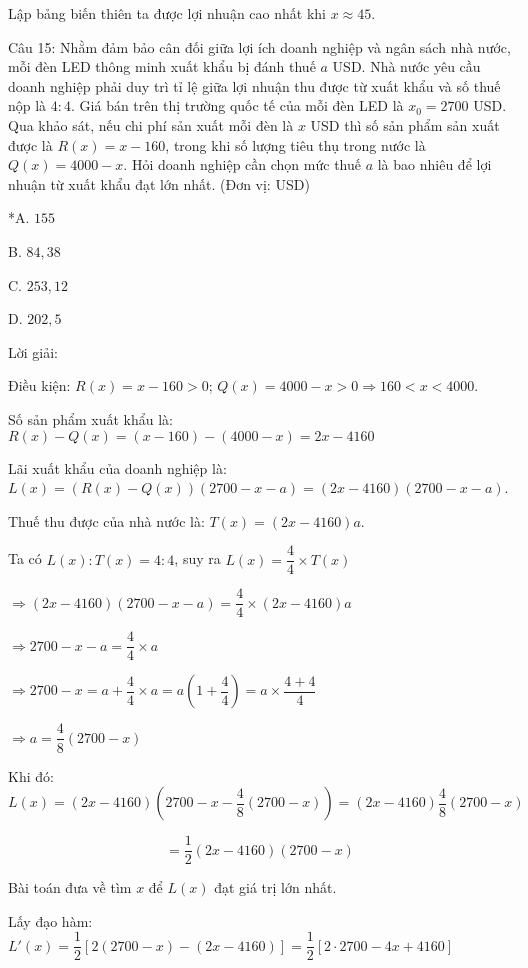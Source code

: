 \documentclass[a4paper,12pt]{article}
\begin{document}
Lập bảng biến thiên ta được lợi nhuận cao nhất khi \(x \approx 45\).




Câu 15: Nhằm đảm bảo cân đối giữa lợi ích doanh nghiệp và ngân sách nhà nước, mỗi đèn LED thông minh xuất khẩu bị đánh thuế \(a\) USD. Nhà nước yêu cầu doanh nghiệp phải duy trì tỉ lệ giữa lợi nhuận thu được từ xuất khẩu và số thuế nộp là \(4 : 4\). Giá bán trên thị trường quốc tế của mỗi đèn LED là \(x_0 = 2700\) USD. Qua khảo sát, nếu chi phí sản xuất mỗi đèn là \(x\) USD thì số sản phẩm sản xuất được là \(R(x) = x - 160\), trong khi số lượng tiêu thụ trong nước là \(Q(x) = 4000 - x\). Hỏi doanh nghiệp cần chọn mức thuế \(a\) là bao nhiêu để lợi nhuận từ xuất khẩu đạt lớn nhất. (Đơn vị: USD)

*A. \(155\)

B. \(84,38\)

C. \(253,12\)

D. \(202,5\)

Lời giải:


Điều kiện: \(R(x) = x - 160 > 0\); \(Q(x) = 4000 - x > 0 \Rightarrow 160 < x < 4000\).

Số sản phẩm xuất khẩu là: \(R(x) - Q(x) = (x - 160) - (4000 - x) = 2x - 4160\)

Lãi xuất khẩu của doanh nghiệp là: \(L(x) = (R(x) - Q(x))(2700 - x - a) = (2x - 4160)(2700 - x - a)\).

Thuế thu được của nhà nước là: \(T(x) = (2x - 4160)a\).

Ta có \(L(x) : T(x) = 4 : 4\), suy ra \(L(x) = \dfrac{4}{4} \times T(x)\)

\(\Rightarrow (2x - 4160)(2700 - x - a) = \dfrac{4}{4} \times (2x - 4160)a\)

\(\Rightarrow 2700 - x - a = \dfrac{4}{4} \times a\)

\(\Rightarrow 2700 - x = a + \dfrac{4}{4} \times a = a\left(1 + \dfrac{4}{4}\right) = a \times \dfrac{4 + 4}{4}\)

\(\Rightarrow a = \dfrac{4}{8}(2700 - x)\)

Khi đó:
$$L(x) = (2x - 4160)\left(2700 - x - \dfrac{4}{8}(2700 - x)\right) = (2x - 4160) \dfrac{4}{8}(2700 - x)$$

$$= \dfrac{1}{2}(2x - 4160)(2700 - x)$$

Bài toán đưa về tìm \(x\) để \(L(x)\) đạt giá trị lớn nhất.

Lấy đạo hàm: \(L'(x) = \dfrac{1}{2}[2(2700 - x) - (2x - 4160)] = \dfrac{1}{2}[2 \cdot 2700 - 4x + 4160]\)
\end{document}
